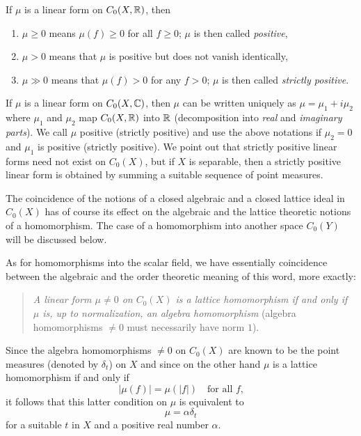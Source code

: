 If $\mu$ is a linear form on $C_{0}(X,\mathbb{R})$, then
\begin{enumerate}[\upshape (i), labelindent=.5em]

\item
$\mu \geq 0$ means  $ \mu(f) \geq 0 $ for all $ f \geq 0 $;  $ \mu $ is then called \emph{positive},

\item
$ \mu > 0 $ means that $ \mu $ is positive but does not vanish identically,

\item
$ \mu \gg 0 $ means that $ \mu(f) > 0 $ for any $ f > 0 $;  $ \mu $ is then called \emph{strictly positive}.

\end{enumerate}
If $\mu$ is a linear form on $C_{0}(X,\mathbb{C})$, then $\mu$ can be written uniquely as $\mu = \mu_{1} + i\mu_{2}$ where $\mu_{1}$ and $\mu_{2}$ map $C_{0}(X,\mathbb{R})$ into $\mathbb{R}$ (decomposition into \emph{real} and \emph{imaginary parts}).
We call $\mu$ positive (strictly positive) and use the above notations if $\mu_{2} = 0$ and $\mu_{1}$ is positive (strictly positive).
We point out that strictly positive linear forms need not exist on $C_{0}(X)$, but if $X$ is separable, then a strictly positive linear form is obtained by summing a suitable sequence of point measures.

The coincidence of the notions of a closed algebraic and a closed lattice ideal in $C_{0}(X)$ has of course its effect on the algebraic and the lattice theoretic notions of a homomorphism.
The case of a homomorphism into another space $C_{0}(Y)$ will be discussed below.

As for homomorphisms into the scalar field, we have essentially coincidence between the algebraic and the order theoretic meaning of this word, more exactly: 
\begin{quote}
\emph{A linear form $\mu \neq 0$ on $C_{0}(X)$ is a lattice homomorphism if and only if $\mu$ is, up to normalization, an algebra homomorphism }(algebra homomorphisms $\neq 0$ must necessarily have norm $1$).
\end{quote}
Since the algebra homomorphisms $\neq 0$ on $C_{0}(X)$ are known to be the point measures (denoted by $\delta_{t}$) on $X$ and since on the other hand $\mu$ is a lattice homomorphism if and only if 
%
\[
	|\mu(f)| =  \mu(|f|) \quad \text{for all $f$,}
\]
%
it follows that this latter condition on $\mu$ is equivalent to 
%
\[
	\mu = \alpha\delta_{t}
\]
%
for a suitable $t$ in $X$ and a positive real number $\alpha$.

